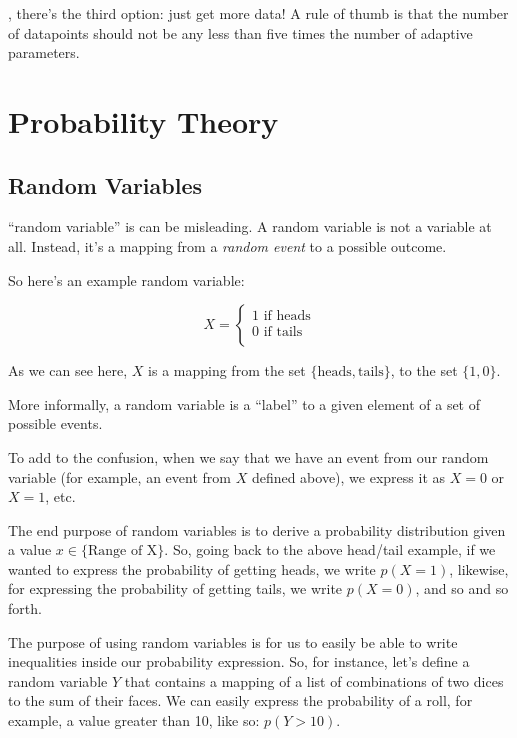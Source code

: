 \documentclass{tufte-handout}
\begin{document}
, there's the third option: just get more data! A rule of
thumb is that the number of datapoints should not be any less than five times
the number of adaptive parameters.

\section{Probability Theory}

\subsection{Random Variables}

 ``random variable'' is can be misleading. A random
variable is not a variable at all. Instead, it's a mapping from a
\emph{random event} to a possible outcome.

So here's an example random variable:

\begin{equation}
  X =
    \begin{cases}
      1 \text{ if } \text{heads} \\
      0 \text{ if } \text{tails} \\
    \end{cases}
\end{equation}

As we can see here, $X$ is a mapping from the set $\{ \text{heads},
\text{tails} \}$, to the set $\{ 1, 0 \}$.

More informally, a random variable is a ``label'' to a given element of a set of
possible events.

To add to the confusion, when we say that we have an event from our random
variable (for example, an event from $X$ defined above), we express it as
$X = 0$ or $X = 1$, etc.

The end purpose of random variables is to derive a probability distribution
given a value $x \in \{ \text{Range of X} \}$. So, going back to the above
head/tail example, if we wanted to express the probability of getting heads, we
write $p(X = 1)$, likewise, for expressing the probability of getting tails, we
write $p(X = 0)$, and so and so forth.

The purpose of using random variables is for us to easily be able to write
inequalities inside our probability expression. So, for instance, let's define a
random variable $Y$ that contains a mapping of a list of combinations of two
dices to the sum of their faces. We can easily express the probability of a
roll, for example, a value greater than 10, like so: $p(Y > 10)$.

% 
% 
\end{document}
